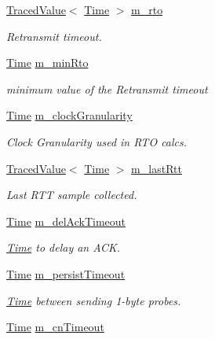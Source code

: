 \begin{DoxyCompactItemize}
\hyperlink{classns3_1_1TracedValue}{Traced\+Value}$<$ \hyperlink{classns3_1_1Time}{Time} $>$ \hyperlink{classns3_1_1TcpSocketBase_a47788384a59ae230896377ceab6829d4}{m\+\_\+rto}
\begin{DoxyCompactList}\small\item\em Retransmit timeout. \end{DoxyCompactList}\item 
\hyperlink{classns3_1_1Time}{Time} \hyperlink{classns3_1_1TcpSocketBase_a0e95a7381ca2a157516e7f2e86455922}{m\+\_\+min\+Rto}
\begin{DoxyCompactList}\small\item\em minimum value of the Retransmit timeout \end{DoxyCompactList}\item 
\hyperlink{classns3_1_1Time}{Time} \hyperlink{classns3_1_1TcpSocketBase_a92035196e6807e1430369bdfdead2e46}{m\+\_\+clock\+Granularity}
\begin{DoxyCompactList}\small\item\em Clock Granularity used in R\+TO calcs. \end{DoxyCompactList}\item 
\hyperlink{classns3_1_1TracedValue}{Traced\+Value}$<$ \hyperlink{classns3_1_1Time}{Time} $>$ \hyperlink{classns3_1_1TcpSocketBase_a6c48fbea019c593b975bd1d5f5c95dde}{m\+\_\+last\+Rtt}
\begin{DoxyCompactList}\small\item\em Last R\+TT sample collected. \end{DoxyCompactList}\item 
\hyperlink{classns3_1_1Time}{Time} \hyperlink{classns3_1_1TcpSocketBase_ad7eb8814b40c3d1c26b60df6759748d4}{m\+\_\+del\+Ack\+Timeout}
\begin{DoxyCompactList}\small\item\em \hyperlink{classns3_1_1Time}{Time} to delay an A\+CK. \end{DoxyCompactList}\item 
\hyperlink{classns3_1_1Time}{Time} \hyperlink{classns3_1_1TcpSocketBase_a036e720fee99f359c288110f90180a62}{m\+\_\+persist\+Timeout}
\begin{DoxyCompactList}\small\item\em \hyperlink{classns3_1_1Time}{Time} between sending 1-\/byte probes. \end{DoxyCompactList}\item 
\hyperlink{classns3_1_1Time}{Time} \hyperlink{classns3_1_1TcpSocketBase_a7ee27f03de14c2f9f3d8fcda1e32352e}{m\+\_\+cn\+Timeout}

\end{DoxyCompactItemize}
